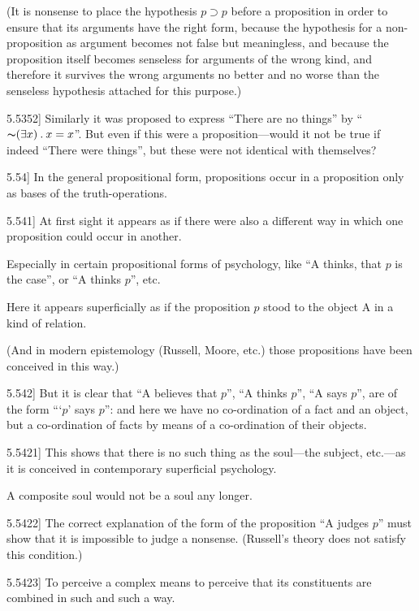 \documentclass[12pt,oneside]{book}[2007/10/19]
\newcommand{\PropositionE}[2]{%
  \item[\phantomsection\label{PropE:#1}\PropGRef{#1}] #2%
}
\newcommand{\PropGRef}[1]{\hyperref[PropG:#1]{#1}}
\newcommand{\DPtypo}[2]{#2}
\newcommand{\Not}[1]{\mathord{\thicksim} #1}
\newcommand{\DotOp}{\mathbin{.}}
\newcommand{\Implies}{\supset}
\begin{document}
\begin{propositions}
{(It is nonsense to place the hypothesis $p \Implies p$
before a proposition in order to ensure that its
arguments have the right form, because the
hypothesis for a non-proposition as argument
becomes not false but meaningless, and because
the proposition itself becomes senseless for arguments
of the wrong kind, and therefore it survives
the wrong arguments no better and no worse
than the senseless hypothesis attached for this
purpose.)}


\PropositionE{5.5352}
{Similarly it was proposed to express ``There are
no things'' by ``$\Not{(\exists x) \DotOp x = x}$''. But even if this
were a proposition---would it not be true if indeed
``There were things'', but these were not identical
with themselves?}


\PropositionE{5.54}
{In the general propositional form, propositions
occur in a proposition only as bases of the truth-operations.}


\PropositionE{5.541}
{At first sight it appears as if there were also a
different way in which one proposition could occur
in another.

Especially in certain propositional forms of
psychology, like ``A thinks, that $p$ is the case'',
or ``A thinks $p$'', etc.

Here it appears superficially as if the proposition
$p$ stood to the object A in a kind of relation.

(And in modern \DPtypo{epistomology}{epistemology} (Russell, Moore,
etc.) those propositions have been conceived in
this way.)}


\PropositionE{5.542}
{But it is clear that ``A believes that $p$'', ``A
thinks $p$'', ``A says $p$'', are of the form ```$p$' says
$p$'': and here we have no co-ordination of a fact
and an object, but a co-ordination of facts by
means of a co-ordination of their objects.}


\PropositionE{5.5421}
{This shows that there is no such thing as the
soul---the subject, etc.---as it is conceived in contemporary
superficial psychology.

A composite soul would not be a soul any
longer.}


\PropositionE{5.5422}
{The correct explanation of the form of the
proposition ``A judges $p$'' must show that it is
impossible to judge a nonsense. (Russell's theory
does not satisfy this condition.)}


\PropositionE{5.5423}
{To perceive a complex means to perceive that
its constituents are combined in such and such a
way.

}
\end{propositions}
\end{document}
